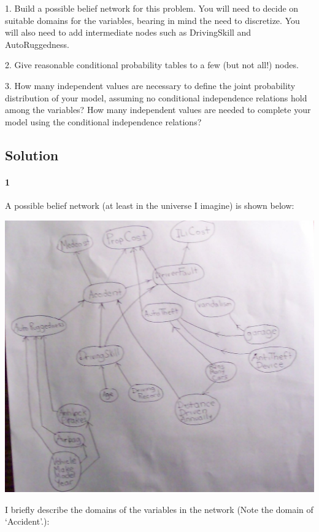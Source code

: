 \documentclass[10pt]{article}
\begin{document}
   1. Build a possible belief network for this problem. You will need to decide on suitable domains for the variables, bearing in mind the need to discretize. You will also need to add intermediate nodes such as DrivingSkill and AutoRuggedness.

   2. Give reasonable conditional probability tables to a few (but not all!) nodes.

   3. How many independent values are necessary to define the joint probability distribution of your model, assuming no conditional independence relations hold among the variables? How many independent values are needed to complete your model using the conditional independence relations? 

\subsection{Solution}

\paragraph{1} A possible belief network (at least in the universe I imagine) is shown below:

 \includegraphics[scale=0.4]{hw4_files/hwBayesNet.jpg}

I briefly describe the domains of the variables in the network (Note the domain of `Accident'.):
\end{document}

